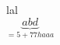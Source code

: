\documentclass[11pt]{memoir}
\begin{document}
lal \\
$\underbrace{abd}_{= 5 + 77 haaa}$
\end{document}
